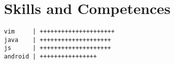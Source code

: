 \section*{Skills and Competences}
\begin{verbatim}
vim     | +++++++++++++++++++++
java    | ++++++++++++++++++++
js      | ++++++++++++++++++++
android | ++++++++++++++++
\end{verbatim}
